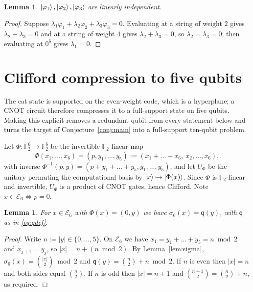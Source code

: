 \documentclass[11pt]{article}
\theoremstyle{plain}
\newtheorem{lemma}[theorem]{Lemma}
\theoremstyle{definition}
\newcommand{\F}{\mathbb{F}}
\newcommand{\qq}{\mathsf{q}}
\newcommand{\Ev}{\mathcal{E}}
\newcommand{\wt}[1]{\lvert #1\rvert}
\begin{document}
\begin{lemma}\label{lem:phiindep}
$\ket{\varphi_1},\ket{\varphi_2},\ket{\varphi_3}$ are linearly independent.
\end{lemma}

\begin{proof}
Suppose $\lambda_1\varphi_1+\lambda_2\varphi_2+\lambda_3\varphi_3=0$. Evaluating at a
string of weight $2$ gives $\lambda_2-\lambda_3=0$ and at a string of weight $4$ gives
$\lambda_2+\lambda_3=0$, so $\lambda_2=\lambda_3=0$; then evaluating at $0^6$ gives
$\lambda_1=0$.
\end{proof}

\section{Clifford compression to five qubits}\label{sec:compress}

The cat state is supported on the even-weight code, which is a hyperplane; a CNOT
circuit therefore compresses it to a full-support state on five qubits. Making this
explicit removes a redundant qubit from every statement below and turns the target of
Conjecture~\ref{conj:main} into a full-support ten-qubit problem.

Let $\Phi:\F_2^6\to\F_2^6$ be the invertible $\F_2$-linear map
\begin{equation}\label{eq:Phi}
\Phi(x_1,\dots,x_6)=(p,y_1,\dots,y_5):=(x_1+\dots+x_6,\ x_2,\dots,x_6),
\end{equation}
with inverse $\Phi^{-1}(p,y)=(p+y_1+\dots+y_5,y_1,\dots,y_5)$, and let $U_\Phi$ be the
unitary permuting the computational basis by $\ket x\mapsto\ket{\Phi(x)}$. Since $\Phi$
is $\F_2$-linear and invertible, $U_\Phi$ is a product of CNOT gates, hence Clifford.
Note $x\in\Ev_6\iff p=0$.

\begin{lemma}\label{lem:sigmaq}
For $x\in\Ev_6$ with $\Phi(x)=(0,y)$ we have $\sigma_6(x)=\qq(y)$, with $\qq$ as in
\eqref{eq:qdef}.
\end{lemma}

\begin{proof}
Write $n:=\wt y\in\{0,\dots,5\}$. On $\Ev_6$ we have $x_1=y_1+\dots+y_5=n\bmod2$ and
$x_{j+1}=y_j$, so $\wt x=n+(n\bmod 2)$. By Lemma~\ref{lem:sigma},
$\sigma_6(x)=\binom{\wt x}2\bmod2$ and $\qq(y)=\binom n2+n\bmod2$. If $n$ is even then
$\wt x=n$ and both sides equal $\binom n2$. If $n$ is odd then $\wt x=n+1$ and
$\binom{n+1}2=\binom n2+n$, as required.
\end{proof}
\end{document}
